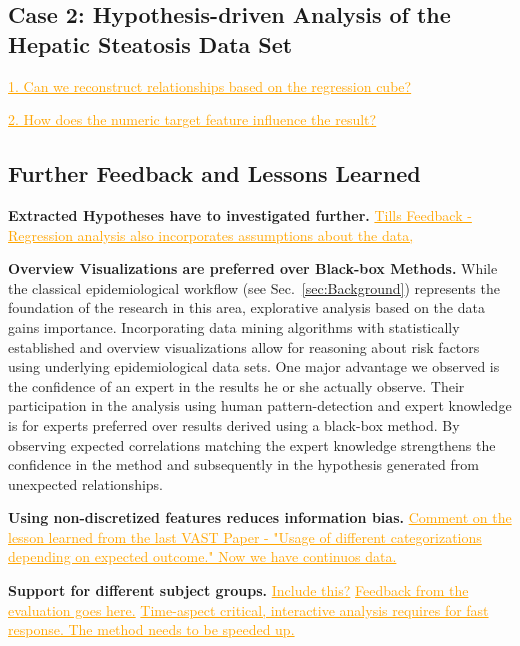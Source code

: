 \documentclass[journal]{style/vgtc} 			          %
\newcommand{\com}[1]{\textcolor{orange}{\uline{#1}}}
\begin{document}
\subsection{Case 2: Hypothesis-driven Analysis of the Hepatic Steatosis Data Set}
\com{1. Can we reconstruct relationships based on the regression cube?}

\com{2. How does the numeric target feature influence the result?}

\subsection{Further Feedback and Lessons Learned} \label{Lessons Learned}
\textbf{Extracted Hypotheses have to investigated further.}
\com{Tills Feedback - Regression analysis also incorporates assumptions about the data, }

\textbf{Overview Visualizations are preferred over Black-box Methods.}
While the classical epidemiological workflow (see Sec.~\ref{sec:Background}) represents the foundation of the research in this area, explorative analysis based on the data gains importance.
Incorporating data mining algorithms with statistically established and overview visualizations allow for reasoning about risk factors using underlying epidemiological data sets.
One major advantage we observed is the confidence of an expert in the results he or she actually observe.
Their participation in the analysis using human pattern-detection and expert knowledge is for experts preferred over results derived using a black-box method.
By observing expected correlations matching the expert knowledge strengthens the confidence in the method and subsequently in the hypothesis generated from unexpected relationships.

\textbf{Using non-discretized features reduces information bias.}
\com{Comment on the lesson learned from the last VAST Paper - "Usage of different categorizations depending on expected outcome." Now we have continuos data.}

\textbf{Support for different subject groups.}
\com{Include this?}
\com{Feedback from the evaluation goes here.}
\com{Time-aspect critical, interactive analysis requires for fast response. The method needs to be speeded up.}
\end{document}
